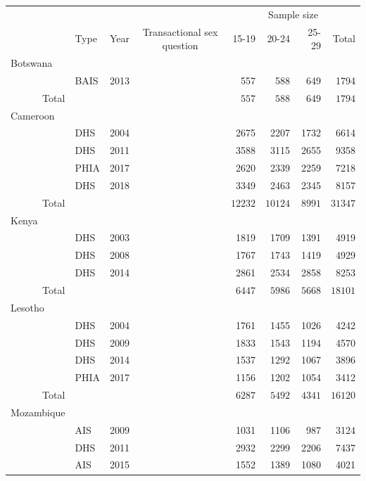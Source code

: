 \documentclass[a4paper, nobind]{templates/ociamthesis}
\newcommand{\cmark}{\ding{51}}
\newcommand{\xmark}{\ding{55}}
\begin{document}
\begin{longtable}{rlrcrrrr}
\toprule
\multicolumn{1}{l}{} &  &  &  & \multicolumn{4}{c}{Sample size} \\ 
\cmidrule(lr){5-8}
\multicolumn{1}{l}{} & Type & Year & Transactional sex question & 15-19 & 20-24 & 25-29 & Total \\ 
\midrule
\multicolumn{1}{l}{Botswana} \\ 
\midrule
 & BAIS & 2013 & \cmark & 557 & 588 & 649 & 1794 \\ 
Total &  &  &  & $557$ & $588$ & $649$ & $1794$ \\ 
\midrule
\multicolumn{1}{l}{Cameroon} \\ 
\midrule
 & DHS & 2004 & \xmark & 2675 & 2207 & 1732 & 6614 \\ 
 & DHS & 2011 & \xmark & 3588 & 3115 & 2655 & 9358 \\ 
 & PHIA & 2017 & \xmark & 2620 & 2339 & 2259 & 7218 \\ 
 & DHS & 2018 & \cmark & 3349 & 2463 & 2345 & 8157 \\ 
Total &  &  &  & $12232$ & $10124$ & $8991$ & $31347$ \\ 
\midrule
\multicolumn{1}{l}{Kenya} \\ 
\midrule
 & DHS & 2003 & \xmark & 1819 & 1709 & 1391 & 4919 \\ 
 & DHS & 2008 & \xmark & 1767 & 1743 & 1419 & 4929 \\ 
 & DHS & 2014 & \xmark & 2861 & 2534 & 2858 & 8253 \\ 
Total &  &  &  & $6447$ & $5986$ & $5668$ & $18101$ \\ 
\midrule
\multicolumn{1}{l}{Lesotho} \\ 
\midrule
 & DHS & 2004 & \xmark & 1761 & 1455 & 1026 & 4242 \\ 
 & DHS & 2009 & \xmark & 1833 & 1543 & 1194 & 4570 \\ 
 & DHS & 2014 & \xmark & 1537 & 1292 & 1067 & 3896 \\ 
 & PHIA & 2017 & \cmark & 1156 & 1202 & 1054 & 3412 \\ 
Total &  &  &  & $6287$ & $5492$ & $4341$ & $16120$ \\ 
\midrule
\multicolumn{1}{l}{Mozambique} \\ 
\midrule
 & AIS & 2009 & \xmark & 1031 & 1106 & 987 & 3124 \\ 
 & DHS & 2011 & \xmark & 2932 & 2299 & 2206 & 7437 \\ 
 & AIS & 2015 & \xmark & 1552 & 1389 & 1080 & 4021 \\ 

\end{longtable}
\end{document}
